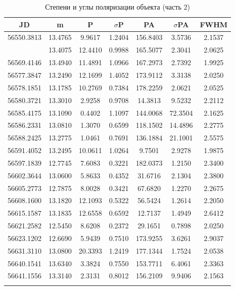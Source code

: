\begin{table}[h]
  \centering
  \caption{Степени и углы поляризации объекта (часть 2)}
  \begin{tabular}{ccccccc}
    \toprule
    JD &
    m &
    P &
    $\sigma$P &
    PA &
    $\sigma$PA &
    FWHM \\
    \midrule
    56550.3813 & 13.4765 & 9.9617 & 1.2404 & 156.8403 & 3.5736 & 2.1537 \\
    \arrayrulecolor{black!40}
    \midrule
    56552.3971 & 13.4075 & 12.4410 & 0.9988 & 165.5077 & 2.3041 & 2.0625 \\
    \midrule
    56569.4146 & 13.4940 & 11.4891 & 1.0966 & 167.2973 & 2.7392 & 1.9925 \\
    \midrule
    56577.3847 & 13.2490 & 12.1699 & 1.4052 & 173.9112 & 3.3138 & 2.0250 \\
    \midrule
    56578.1851 & 13.1785 & 10.2769 & 0.7384 & 178.2259 & 2.0621 & 2.0525 \\
    \midrule
    56580.3721 & 13.3010 & 2.9258 & 0.9708 & 14.3813 & 9.5232 & 2.2112 \\
    \midrule
    56585.4175 & 13.1090 & 0.4402 & 1.1097 & 144.0068 & 72.3504 & 2.1625 \\
    \midrule
    56586.2331 & 13.0810 & 1.3070 & 0.6599 & 118.1502 & 14.4896 & 2.2775 \\
    \midrule
    56588.2425 & 13.2775 & 1.0461 & 0.7691 & 136.1884 & 21.1001 & 2.5575 \\
    \midrule
    56591.4052 & 13.2495 & 10.0611 & 1.0264 & 9.7501 & 2.9278 & 1.9875 \\
    \midrule
    56597.1839 & 12.7745 & 7.6083 & 0.3221 & 182.0373 & 1.2150 & 2.3400 \\
    \midrule
    56602.3644 & 13.0600 & 5.8633 & 0.4352 & 31.6716 & 2.1304 & 2.3800 \\
    \midrule
    56605.2773 & 12.7875 & 8.0028 & 0.3421 & 67.6820 & 1.2270 & 2.2675 \\
    \midrule
    56608.1600 & 13.1820 & 12.1093 & 0.5322 & 56.5424 & 1.2614 & 2.2050 \\
    \midrule
    56615.1587 & 13.1835 & 12.6558 & 0.6592 & 12.7137 & 1.4949 & 2.6412 \\
    \midrule
    56621.2582 & 12.5450 & 8.6208 & 0.2372 & 29.1651 & 0.7898 & 2.0250 \\
    \midrule
    56623.1202 & 12.6690 & 5.9439 & 0.7510 & 173.9255 & 3.6261 & 2.9037 \\
    \midrule
    56631.3110 & 13.0800 & 20.3393 & 1.2419 & 177.1344 & 1.7524 & 2.0538 \\
    \midrule
    56640.1541 & 13.6340 & 3.3824 & 0.7550 & 153.7711 & 6.4061 & 2.3363 \\
    \midrule
    56641.1556 & 13.3140 & 2.3131 & 0.8012 & 156.2109 & 9.9406 & 2.1563 \\
    \arrayrulecolor{black}
    \bottomrule
  \end{tabular}
\end{table}

